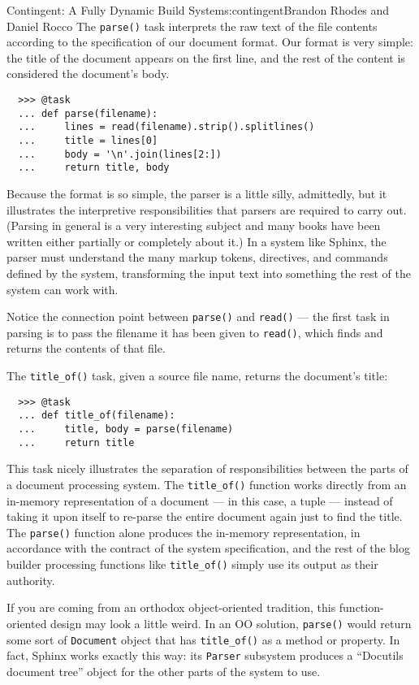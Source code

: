 \begin{aosachapter}{Contingent: A Fully Dynamic Build System}{s:contingent}{Brandon Rhodes and Daniel Rocco}
The \texttt{parse()} task interprets the raw text of the file contents
according to the specification of our document format. Our format is
very simple: the title of the document appears on the first line, and
the rest of the content is considered the document's body.

\begin{verbatim}
  >>> @task
  ... def parse(filename):
  ...     lines = read(filename).strip().splitlines()
  ...     title = lines[0]
  ...     body = '\n'.join(lines[2:])
  ...     return title, body
\end{verbatim}

Because the format is so simple, the parser is a little silly,
admittedly, but it illustrates the interpretive responsibilities that
parsers are required to carry out. (Parsing in general is a very
interesting subject and many books have been written either partially or
completely about it.) In a system like Sphinx, the parser must
understand the many markup tokens, directives, and commands defined by
the system, transforming the input text into something the rest of the
system can work with.

Notice the connection point between \texttt{parse()} and \texttt{read()}
--- the first task in parsing is to pass the filename it has been given
to \texttt{read()}, which finds and returns the contents of that file.

The \texttt{title\_of()} task, given a source file name, returns the
document's title:

\begin{verbatim}
  >>> @task
  ... def title_of(filename):
  ...     title, body = parse(filename)
  ...     return title
\end{verbatim}

This task nicely illustrates the separation of responsibilities between
the parts of a document processing system. The \texttt{title\_of()}
function works directly from an in-memory representation of a document
--- in this case, a tuple --- instead of taking it upon itself to
re-parse the entire document again just to find the title. The
\texttt{parse()} function alone produces the in-memory representation,
in accordance with the contract of the system specification, and the
rest of the blog builder processing functions like \texttt{title\_of()}
simply use its output as their authority.

If you are coming from an orthodox object-oriented tradition, this
function-oriented design may look a little weird. In an OO solution,
\texttt{parse()} would return some sort of \texttt{Document} object that
has \texttt{title\_of()} as a method or property. In fact, Sphinx works
exactly this way: its \texttt{Parser} subsystem produces a ``Docutils
document tree'' object for the other parts of the system to use.


\end{aosachapter}
